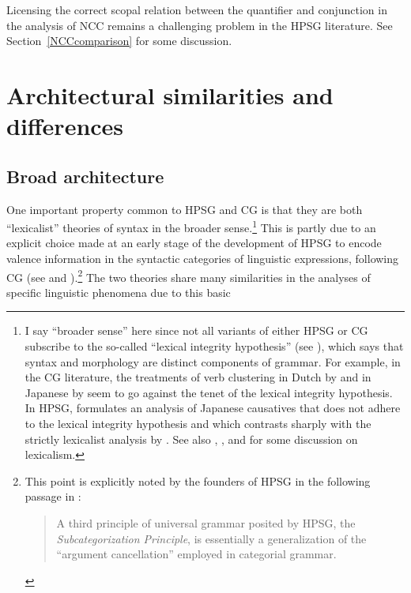 \documentclass[output=paper
                ,modfonts
                ,nonflat
	        ,collection
	        ,collectionchapter
	        ,collectiontoclongg
 	        ,biblatex
                ,babelshorthands
                ,newtxmath
                ,draftmode
                ,colorlinks, citecolor=brown
]{./langsci/langscibook}
\begin{document}
Licensing the correct scopal relation between the quantifier and
conjunction in the analysis of NCC remains a challenging problem in
the HPSG literature. See Section~\ref{NCCcomparison} for some
discussion.

\section{Architectural similarities and differences \label{architecture}}

\subsection{Broad architecture}

One important property common to HPSG and CG is that they are both
``lexicalist'' theories of syntax in the broader sense.\footnote{I say
``broader sense'' here since not all variants of either HPSG or CG subscribe to the
so-called ``lexical integrity hypothesis'' (see 
), which says that syntax and 
morphology are distinct components of grammar. For example, in the CG literature, 
the treatments of verb clustering in Dutch by \citet{moortgatoehrle94} and
in Japanese by \citet{Kubota2014a-u} seem to go against the tenet of
the lexical integrity hypothesis. In HPSG,
\citet{Gunji99a-u} formulates an analysis of Japanese
causatives that does not adhere to the lexical integrity hypothesis and which 
contrasts sharply with the strictly lexicalist analysis by 
\citet{MSI99a}. 
See also , 
\citet{Bruening2018a, Bruening2018c-u}, \citet{MuellerLexicalism} and \citet{MWArgSt}
for some discussion on lexicalism.} 
This is partly due to an explicit choice made at an early
stage of the development of HPSG to encode valence information in the
syntactic categories of linguistic expressions, following CG
(see  and ).\footnote{This
  point is explicitly noted by the founders of HPSG
  in the following passage in \citet{ps}:

\begin{quote}
A third principle of universal grammar posited by HPSG, the
\textit{Subcategorization Principle}, is essentially a generalization of the
``argument cancellation'' employed in categorial grammar. \hfill \citep[11]{ps}
\end{quote}

}
The two theories share many similarities in the
analyses of specific linguistic phenomena due to this basic
\end{document}
